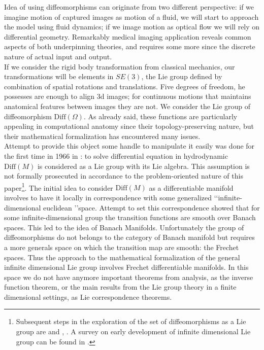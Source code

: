 Idea of using diffeomorphisms can originate from two different perspective: if we imagine motion of captured images as motion of a fluid, we will start to approach the model using fluid dynamics; if we image motion as optical flow we will rely on differential geometry. Remarkably medical imaging application reveals common aspects of both underpinning theories, and requires some more since the discrete nature of actual input and output.\\
If we consider the rigid body transformation from classical mechanics, our transformations will be elements in $SE(3)$, the Lie group defined by combination of spatial rotations and translations. Five degrees of freedom, he possesses are enough to align 3d images; for continuous motions that maintains anatomical features between images they are not. We consider the Lie group of diffeomorphism $\text{Diff}(\Omega)$.
As already said, these functions are particularly appealing in computational anatomy since their topology-preserving nature, but their mathematical formalization has encountered many issues.\\ 
Attempt to provide this object some handle to manipulate it easily was done for the first time in 1966 in \cite{arnold1966geometrie}: to solve differential equation in hydrodynamic  $\text{Diff}(M)$ is considered as a Lie group with its Lie algebra. This assumption is not formally prosecuted in accordance to the problem-oriented nature of this paper\footnote{Subsequent steps in the exploration of the set of diffeomorphisms as a Lie group are \cite{marsden1970hamiltonian} and \cite{leslie1983lie}, \cite{omori1970group}. A survey on early development of infinite dimensional Lie group can be found in \cite{milnor1984remarks}.}.
The initial idea to consider $\text{Diff}(M)$ as a differentiable manifold involves to have it locally in correspondence with some generalized \lq\lq infinite-dimensional euclidean \rq\rq space. Attempt to set this correspondence showed that for some infinite-dimensional group the transition functions are smooth over Banach spaces. This led to the idea of Banach Manifolds. Unfortunately the group of diffeomorphisms do not belongs to the category of Banach manifold but requires a more generals space on which the transition map are smooth: the Frechet spaces. 
Thus the approach to the mathematical formalization of the general infinite dimensional Lie group involves Frechet differentiable manifolds. In this space we do not have anymore important theorems from analysis, as the inverse function theorem, or the main results from the Lie group theory in a finite dimensional settings, as Lie correspondence theorems.\\
